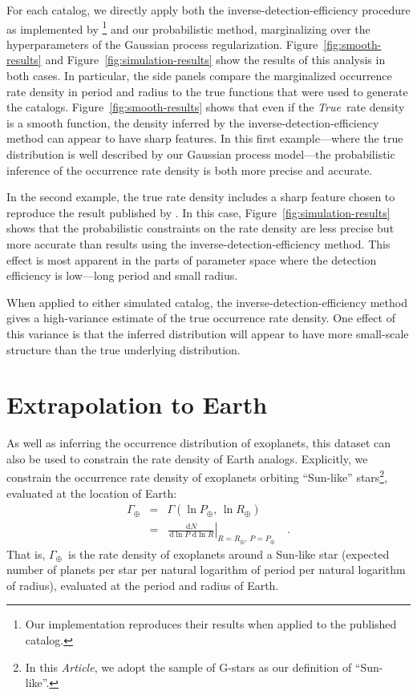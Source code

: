 \documentclass[12pt,preprint]{aastex}
\newcommand{\paper}{\textsl{Article}}
\newcommand{\foreign}[1]{\emph{#1}}
\newcommand{\True}{\foreign{True}}
\newcommand{\figref}[1]{\ref{fig:#1}}
\newcommand{\Fig}[1]{Figure~\figref{#1}}
\newcommand{\fig}[1]{\Fig{#1}}
\newcommand{\eqlabel}[1]{\label{eq:#1}}
\newcommand{\sectlabel}[1]{\label{sect:#1}}
\newcommand{\dd}{\ensuremath{\,\mathrm{d}}}
\newcommand{\rate}{\ensuremath{\Gamma}}
\newcommand{\radius}{\ensuremath{R}}
\newcommand{\period}{\ensuremath{P}}
\newcommand{\gammaearth}{{\ensuremath{\rate_\oplus}}}
\begin{document}
For each catalog, we directly apply both the inverse-detection-efficiency
procedure as implemented by \citealt{petigura}\footnote{Our implementation
reproduces their results when applied to the published catalog.} and our
probabilistic method, marginalizing over the hyperparameters of the Gaussian
process regularization.
\Fig{smooth-results} and \fig{simulation-results} show the results of this
analysis in both cases.
In particular, the side panels compare the marginalized occurrence rate
density in period and radius to the true functions that were used to
generate the catalogs.
\Fig{smooth-results} shows that even if the \True\ rate density is a smooth
function, the density inferred by the inverse-detection-efficiency method can
appear to have sharp features.
In this first example---where the true distribution is well described by our
Gaussian process model---the probabilistic inference of the occurrence rate
density is both more precise and accurate.

In the second example, the true rate density includes a sharp feature chosen
to reproduce the result published by \citet{petigura}.
In this case, \fig{simulation-results} shows that the probabilistic
constraints on the rate density are less precise but more accurate than
results using the inverse-detection-efficiency method.
This effect is most apparent in the parts of parameter space where the
detection efficiency is low---long period and small radius.

When applied to either simulated catalog, the inverse-detection-efficiency
method gives a high-variance estimate of the true occurrence rate density.
One effect of this variance is that the inferred distribution will appear to
have more small-scale structure than the true underlying distribution.

\section{Extrapolation to Earth}
\sectlabel{extrap}

As well as inferring the occurrence distribution of exoplanets, this dataset
can also be used to constrain the rate density of Earth analogs.
Explicitly, we constrain the occurrence rate density of exoplanets orbiting
``Sun-like'' stars\footnote{In this \paper, we adopt the \citet{petigura}
sample of G-stars as our definition of ``Sun-like''.}, evaluated at the
location of Earth:
\begin{eqnarray}\eqlabel{gammaearth}
\gammaearth &=& \rate (\ln\period_\oplus,\,\ln\radius_\oplus) \\
&=&
\left.\frac{\dd N}{\dd\ln\period\,\dd\ln\radius}\right|
_{\radius=\radius_\oplus,\,\period=\period_\oplus}\quad.
\end{eqnarray}
That is, \gammaearth\ is the rate density of exoplanets around a Sun-like
star (expected number of planets per star per natural logarithm of period per
natural logarithm of radius), evaluated at the period and radius of Earth.
\end{document}
